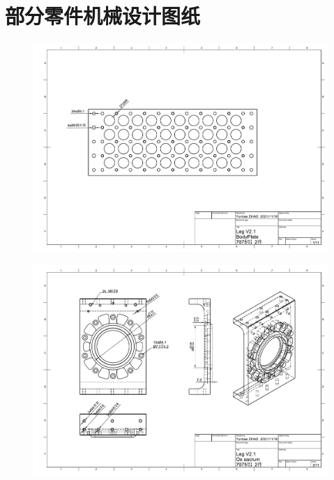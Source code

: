 


\section*{部分零件机械设计图纸}

\begin{figure}[h!]
  \centering
  \includegraphics[width=1.4\linewidth, angle=90]{figures/appendix/dwg1.pdf}
   \vspace{6pt}
\end{figure}

\begin{figure}
  \centering
  \includegraphics[width=1.4\linewidth, angle=90]{figures/appendix/dwg2.pdf}
   \vspace{6pt}
\end{figure}

